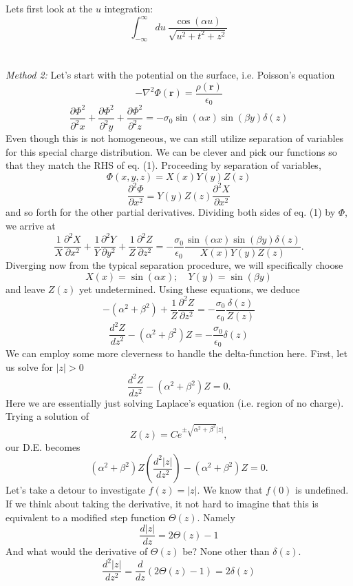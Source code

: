 \documentclass[11pt,letterpaper]{article}
\newcommand{\vect}[1]{\mathbf{#1}}
\begin{document}
\begin{enumerate}
Lets first look at the $u$ integration:
$$\int_{-\infty}^{\infty}{du\ \frac{\cos{(\alpha u)}}{\sqrt{u^2+t^2+z^2}}}$$
 \\ \\\emph{Method 2: }Let's start with the potential on the surface, i.e. Poisson's equation
 $$-\nabla^2\Phi(\vect r) = \frac{\rho(\vect r)}{\epsilon_0}$$
\begin{equation}\frac{\partial \Phi^2}{\partial^2x}+\frac{\partial \Phi^2}{\partial^2y}+\frac{\partial \Phi^2}{\partial^2z} = -\sigma_0\sin(\alpha x)\sin(\beta y)\delta(z)\end{equation}
Even though this is not homogeneous, we can still utilize separation of variables for this special charge distribution. We can be clever and pick our functions so that they match the RHS of eq. (1). Proceeding by separation of variables, 
$$\Phi(x,y,z) = X(x)Y(y)Z(z)$$
$$\frac{\partial^2\Phi}{\partial x^2} = Y(y)Z(z)\frac{\partial^2X}{\partial x^2}$$
and so forth for the other partial derivatives. Dividing both sides of eq. (1) by $\Phi$, we arrive at
$$\frac{1}{X}\frac{\partial^2X}{\partial x^2}+\frac{1}{Y}\frac{\partial^2Y}{\partial y^2}+\frac{1}{Z}\frac{\partial^2Z}{\partial z^2}=-\frac{\sigma_0}{\epsilon_0}\frac{\sin(\alpha x)\sin(\beta y)\delta(z)}{X(x)Y(y)Z(z)}.$$
Diverging now from the typical separation procedure, we will specifically choose 
$$X(x) = \sin(\alpha x);\quad Y(y) = \sin(\beta y)$$
and leave $Z(z)$ yet undetermined. Using these equations, we deduce
$$-(\alpha^2+\beta^2)+ \frac{1}{Z}\frac{\partial^2Z}{\partial z^2} = -\frac{\sigma_0}{\epsilon_0}\frac{\delta(z)}{Z(z)}$$
\begin{equation}\frac{d^2Z}{dz^2}-(\alpha^2+\beta^2)Z = -\frac{\sigma_0}{\epsilon_0}\delta(z)\end{equation}
We can employ some more cleverness to handle the delta-function here. First, let us solve for $|z| > 0$
$$\frac{d^2Z}{dz^2}-(\alpha^2+\beta^2)Z = 0.$$
Here we are essentially just solving Laplace's equation (i.e. region of no charge). Trying a solution of
$$Z(z) = Ce^{\pm\sqrt{\alpha^2+\beta^2}|z|},$$
our D.E. becomes 
$$(\alpha^2+\beta^2)Z\left(\frac{d^2|z|}{dz^2}\right)-(\alpha^2+\beta^2)Z = 0.$$
Let's take a detour to investigate $f(z) = |z|$. We know that $f(0)$ is undefined. If we think about taking the derivative, it not hard to imagine that this is equivalent to a modified step function $\Theta(z)$. Namely
$$\frac{d|z|}{dz} = 2\Theta(z)-1$$
And what would the derivative of $\Theta(z)$ be? None other than $\delta(z)$.
$$\frac{d^2|z|}{dz^2} = \frac{d}{dz}\left(2\Theta(z)-1\right) = 2\delta(z)$$

\end{enumerate}
\end{document}
